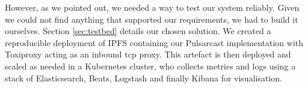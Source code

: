 However, as we pointed out, we needed a way to test our system reliably. Given
we could not find anything that supported our requirements, we had to build it
ourselves. Section \ref{sec:testbed} details our chosen solution. We created a
reproducible deployment of IPFS containing our Pulsarcast implementation with
Toxiproxy acting as an inbound \acrshort{tcp} proxy. This artefact is then
deployed and scaled as needed in a Kubernetes cluster, who collects metrics and
logs using a stack of Elasticsearch, Beats, Logstash and finally Kibana for
visualisation.
